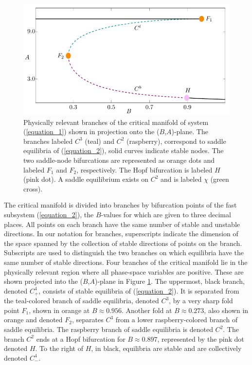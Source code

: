 \documentclass{ws-ijbc}
\begin{document}
\begin{figure}[!t]
\begin{center}
\includegraphics[page=1]{figures.pdf}
\end{center}
\caption{Physically relevant branches of the critical manifold of system (\ref{equation_1}) shown in projection onto the ($B$,$A$)-plane.  The branches labeled $C^3$ (teal) and $C^2$ (raspberry), correspond to saddle equilibria of (\ref{equation_2}), solid curves indicate stable nodes.  The two saddle-node bifurcations are represented as orange dots and labeled $F_1$ and $F_2$, respectively.  The Hopf bifurcation is labeled $H$ (pink dot).  A saddle equilibrium exists on $C^2$ and is labeled $\chi$ (green cross).}
\label{critical_figure}
\end{figure}

The critical manifold is divided into branches by bifurcation points of the fast subsystem (\ref{equation_2}), the $B$-values for which are given to three decimal places.  All points on each branch have the same number of stable and unstable directions.  In our notation for branches, superscripts indicate the dimension of the space spanned by the collection of stable directions of points on the branch.  Subscripts are used to distinguish the two branches on which equilibria have the same number of stable directions.  Four branches of the critical manifold lie in the physically relevant region where all phase-space variables are positive.  These are shown projected into the ($B$,$A$)-plane in Figure \ref{critical_figure}.  The uppermost, black branch, denoted $C^4_+$, consists of stable equilibria of (\ref{equation_2}).  It is separated from the teal-colored branch of saddle equilibria, denoted $C^3$, by a very sharp fold point $F_1$, shown in orange at $B \approx 0.956$.  Another fold at $B \approx 0.273$, also shown in orange and denoted $F_2$, separates $C^3$ from a lower raspberry-colored branch of saddle equilibria.  The raspberry branch of saddle equilibria is denoted $C^2$.   The branch $C^2$ ends at a Hopf bifurcation for $B \approx 0.897$, represented by the pink dot denoted $H$.  To the right of $H$, in black, equilibria are stable and are collectively denoted $C^4_-$.
\end{document}

